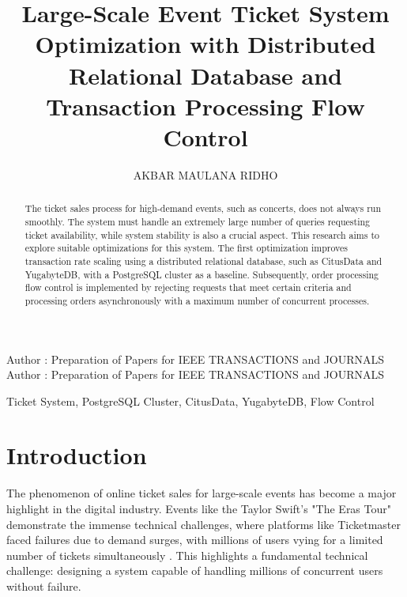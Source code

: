 \documentclass{ieeeaccess}
\begin{document}

\title{Large-Scale Event Ticket System Optimization with Distributed Relational Database and Transaction Processing Flow Control}
\author{\uppercase{Akbar Maulana Ridho}}
\address[1]{Informatics Program, School of Electrical Engineering and Informatics, Institut Teknologi Bandung, Bandung, Indonesia (e-mail: 13521093@std.stei.itb.ac.id)}


\markboth
{Author \headeretal: Preparation of Papers for IEEE TRANSACTIONS and JOURNALS}
{Author \headeretal: Preparation of Papers for IEEE TRANSACTIONS and JOURNALS}


\begin{abstract}
The ticket sales process for high-demand events, such as concerts, does not always run smoothly. The system must handle an extremely large number of queries requesting ticket availability, while system stability is also a crucial aspect. This research aims to explore suitable optimizations for this system. The first optimization improves transaction rate scaling using a distributed relational database, such as CitusData and YugabyteDB, with a PostgreSQL cluster as a baseline. Subsequently, order processing flow control is implemented by rejecting requests that meet certain criteria and processing orders asynchronously with a maximum number of concurrent processes.
\end{abstract}

\begin{keywords}
Ticket System, PostgreSQL Cluster, CitusData, YugabyteDB, Flow Control
\end{keywords}

\titlepgskip=-15pt

\maketitle

\section{Introduction}
\label{sec:introduction}
The phenomenon of online ticket sales for large-scale events has become a major highlight in the digital industry. Events like the Taylor Swift's "The Eras Tour" demonstrate the immense technical challenges, where platforms like Ticketmaster faced failures due to demand surges, with millions of users vying for a limited number of tickets simultaneously \cite{b1}. This highlights a fundamental technical challenge: designing a system capable of handling millions of concurrent users without failure.
\end{document}
